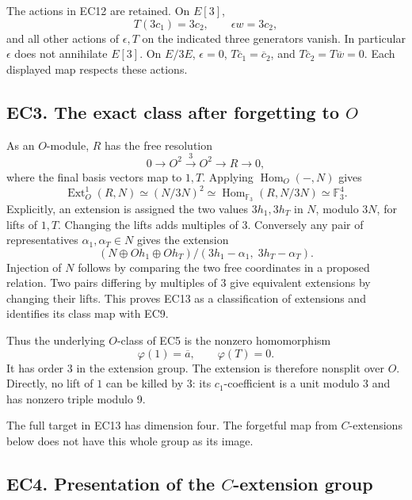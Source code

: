 \documentclass[
  10pt,
  a4paper,
]{article}
\begin{document}
The actions in EC12 are retained. On \(E[3]\), \[
T(3c_1)=3c_2,\qquad\epsilon w=3c_2,
\] and all other actions of \(\epsilon,T\) on the indicated three
generators vanish. In particular \(\epsilon\) does not annihilate
\(E[3]\). On \(E/3E\), \(\epsilon=0\), \(T\overline c_1=\overline c_2\),
and \(T\overline c_2=T\overline w=0\). Each displayed map respects these
actions.

\subsection{\texorpdfstring{EC3. The exact class after forgetting to
\(O\)}{EC3. The exact class after forgetting to O}}\label{ec3.-the-exact-class-after-forgetting-to-o}

As an \(O\)-module, \(R\) has the free resolution \[
0\longrightarrow O^2\xrightarrow{3}O^2\longrightarrow R
\longrightarrow0,
\] where the final basis vectors map to \(1,T\). Applying
\(\operatorname{Hom}_O(-,N)\) gives \[
\operatorname{Ext}^1_O(R,N)
\simeq(N/3N)^2
\simeq\operatorname{Hom}_{\mathbb F_3}(R,N/3N)
\simeq\mathbb F_3^4.
\tag{EC13}
\] Explicitly, an extension is assigned the two values \(3h_1,3h_T\) in
\(N\), modulo \(3N\), for lifts of \(1,T\). Changing the lifts adds
multiples of 3. Conversely any pair of representatives
\(\alpha_1,\alpha_T\in N\) gives the extension \[
(N\oplus O h_1\oplus O h_T)/
(3h_1-\alpha_1,\;3h_T-\alpha_T).
\] Injection of \(N\) follows by comparing the two free coordinates in a
proposed relation. Two pairs differing by multiples of 3 give equivalent
extensions by changing their lifts. This proves EC13 as a classification
of extensions and identifies its class map with EC9.

Thus the underlying \(O\)-class of EC5 is the nonzero homomorphism \[
\varphi(1)=\overline a,\qquad\varphi(T)=0.
\tag{EC14}
\] It has order 3 in the extension group. The extension is therefore
nonsplit over \(O\). Directly, no lift of \(1\) can be killed by 3: its
\(c_1\)-coefficient is a unit modulo 3 and has nonzero triple modulo 9.

The full target in EC13 has dimension four. The forgetful map from
\(C\)-extensions below does not have this whole group as its image.

\subsection{\texorpdfstring{EC4. Presentation of the \(C\)-extension
group}{EC4. Presentation of the C-extension group}}\label{ec4.-presentation-of-the-c-extension-group}
\end{document}
